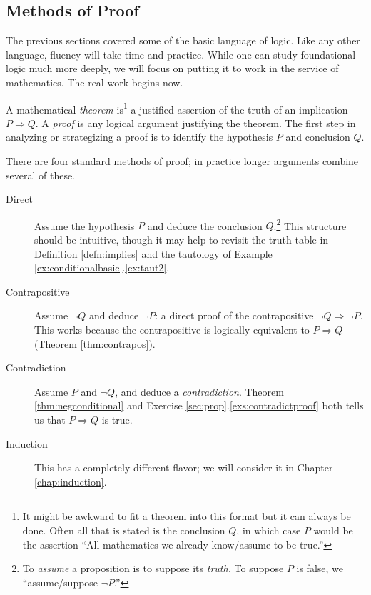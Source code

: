 \clearpage



\subsection{Methods of Proof}\label{sec:proof}

The previous sections covered some of the basic language of logic. Like any other language, fluency will take time and practice. While one can study foundational logic much more deeply, we will focus on putting it to work in the service of mathematics. The real work begins now.\medbreak

A mathematical \emph{theorem} is\footnote{It might be awkward to fit a theorem into this format but it can always be done. Often all that is stated is the conclusion $Q$, in which case $P$ would be the assertion ``All mathematics we already know/assume to be true.''} a justified assertion of the truth of an implication $P\Longrightarrow Q$. A \emph{proof} is any logical argument justifying the theorem. The first step in analyzing or strategizing a proof is to identify the hypothesis $P$ and conclusion $Q$.\medbreak 

There are four standard methods of proof; in practice longer arguments combine several of these.
\begin{description}
	\item[Direct] Assume the hypothesis $P$ and deduce the conclusion $Q$.\footnote{To \emph{assume} a proposition is to suppose its \emph{truth.} To suppose $P$ is false, we ``assume/suppose $\neg P$.''} This structure should be intuitive, though it may help to revisit the truth table in Definition \ref{defn:implies} and the tautology of Example \ref*{ex:conditionalbasic}.\ref{ex:taut2}.
	\item[Contrapositive] Assume $\neg Q$ and deduce $\neg P$: a direct proof of the contrapositive $\neg Q\Longrightarrow\neg P$. This works because the contrapositive is logically equivalent to $P\Longrightarrow Q$ (Theorem \ref{thm:contrapos}).
	\item[Contradiction] Assume $P$ and $\neg Q$, and deduce a \emph{contradiction}. Theorem \ref{thm:negconditional} and Exercise \ref*{sec:prop}.\ref{exs:contradictproof} both tells us that $P\Longrightarrow Q$ is true.
	\item[Induction] This has a completely different flavor; we will consider it in Chapter \ref{chap:induction}.
\end{description}

